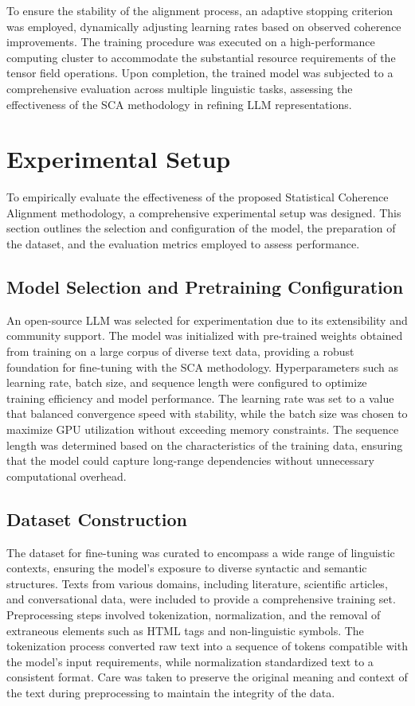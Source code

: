 \documentclass{article}
\begin{document}
To ensure the stability of the alignment process, an adaptive stopping criterion was employed, dynamically adjusting learning rates based on observed coherence improvements. The training procedure was executed on a high-performance computing cluster to accommodate the substantial resource requirements of the tensor field operations. Upon completion, the trained model was subjected to a comprehensive evaluation across multiple linguistic tasks, assessing the effectiveness of the SCA methodology in refining LLM representations.


\section{Experimental Setup}

To empirically evaluate the effectiveness of the proposed Statistical Coherence Alignment methodology, a comprehensive experimental setup was designed. This section outlines the selection and configuration of the model, the preparation of the dataset, and the evaluation metrics employed to assess performance.

\subsection{Model Selection and Pretraining Configuration}

An open-source LLM was selected for experimentation due to its extensibility and community support. The model was initialized with pre-trained weights obtained from training on a large corpus of diverse text data, providing a robust foundation for fine-tuning with the SCA methodology. Hyperparameters such as learning rate, batch size, and sequence length were configured to optimize training efficiency and model performance. The learning rate was set to a value that balanced convergence speed with stability, while the batch size was chosen to maximize GPU utilization without exceeding memory constraints. The sequence length was determined based on the characteristics of the training data, ensuring that the model could capture long-range dependencies without unnecessary computational overhead.

\subsection{Dataset Construction}

The dataset for fine-tuning was curated to encompass a wide range of linguistic contexts, ensuring the model's exposure to diverse syntactic and semantic structures. Texts from various domains, including literature, scientific articles, and conversational data, were included to provide a comprehensive training set. Preprocessing steps involved tokenization, normalization, and the removal of extraneous elements such as HTML tags and non-linguistic symbols. The tokenization process converted raw text into a sequence of tokens compatible with the model's input requirements, while normalization standardized text to a consistent format. Care was taken to preserve the original meaning and context of the text during preprocessing to maintain the integrity of the data.
\end{document}
